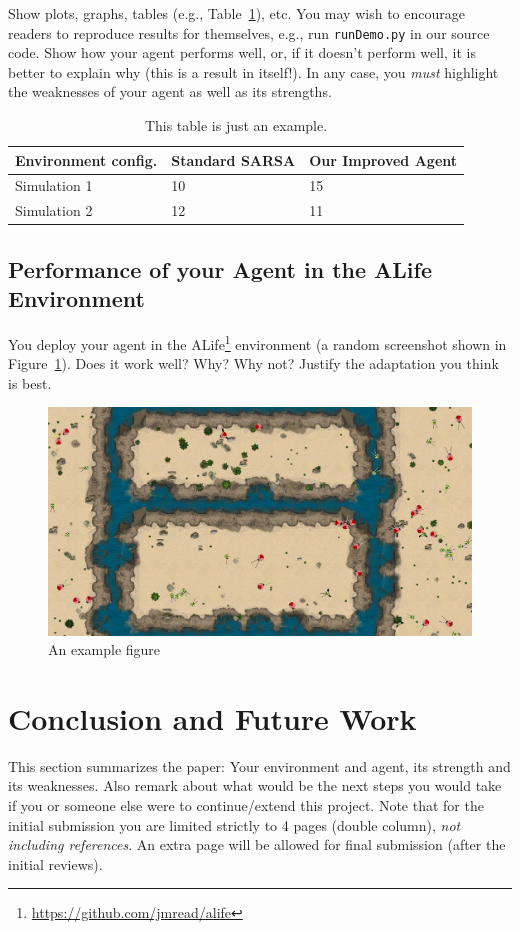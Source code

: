 \documentclass[journal, a4paper]{IEEEtran}
\theoremstyle{plain}
\theoremstyle{definition}
\begin{document}
Show plots, graphs, tables (e.g., Table~\ref{a_table}), etc. You may wish to encourage readers to reproduce results for themselves, e.g., run \texttt{runDemo.py} in our source code. Show how your agent performs well, or, if it doesn't perform well, it is better to explain why (this is a result in itself!). In any case, you \emph{must} highlight the weaknesses of your agent as well as its strengths. \newline


\begin{table}[h]
	\caption{\label{a_table}This table is just an example.}
	\centering
	\begin{tabular}{lll}
		\hline
		\textbf{Environment config.} & \textbf{Standard SARSA} & \textbf{Our Improved Agent}  \\
		\hline
		Simulation 1        & 10             & 15 \\
		Simulation 2        & 12             & 11 \\
		\hline
	\end{tabular}
\end{table}

\subsection{Performance of your Agent in the ALife Environment}

You deploy your agent in the ALife\footnote{\url{https://github.com/jmread/alife}} environment (a random screenshot shown in Figure~\ref{a_figure}). Does it work well? Why? Why not? Justify the adaptation you think is best.

\begin{figure}[h]
	\centering
	\includegraphics[width=0.8\columnwidth]{alife.png}
	\caption{\label{a_figure}An example figure}
\end{figure}


\section{Conclusion and Future Work}
	This section summarizes the paper: Your environment and agent, its strength and its weaknesses. Also remark about what would be the next steps you would take if you or someone else were to continue/extend this project. 
	Note that for the initial submission you are limited strictly to 4 pages (double column), \emph{not including references}. An extra page will be allowed for final submission (after the initial reviews). 
\end{document}
